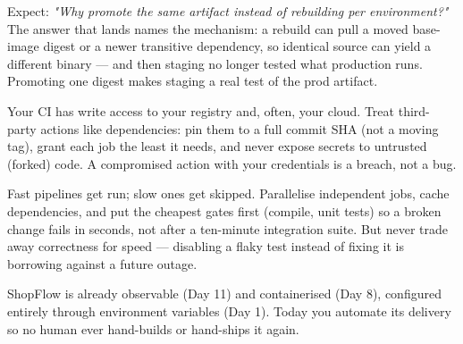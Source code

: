 \begin{interview}
Expect: \emph{"Why promote the same artifact instead of rebuilding per environment?"} The answer that lands names the mechanism: a rebuild can pull a moved base-image digest or a newer transitive dependency, so identical source can yield a different binary --- and then staging no longer tested what production runs. Promoting one digest makes staging a real test of the prod artifact.
\end{interview}

\begin{secwarn}
Your CI has write access to your registry and, often, your cloud. Treat third-party actions like dependencies: pin them to a full commit SHA (not a moving tag), grant each job the least  it needs, and never expose secrets to untrusted (forked) code. A compromised action with your credentials is a breach, not a bug.
\end{secwarn}

\begin{perfnote}
Fast pipelines get run; slow ones get skipped. Parallelise independent jobs, cache dependencies, and put the cheapest gates first (compile, unit tests) so a broken change fails in seconds, not after a ten-minute integration suite. But never trade away correctness for speed --- disabling a flaky test instead of fixing it is borrowing against a future outage.
\end{perfnote}


ShopFlow is already observable (Day 11) and containerised (Day 8), configured entirely through environment variables (Day 1). Today you automate its delivery so no human ever hand-builds or hand-ships it again.

